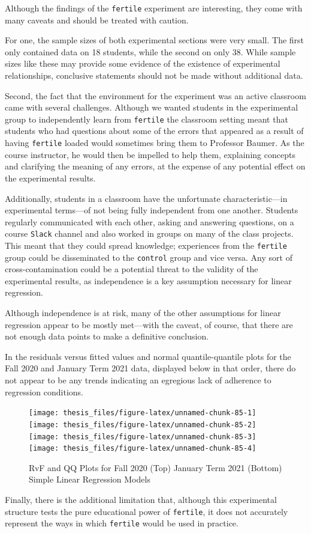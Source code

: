 \documentclass[12pt,twoside]{reedthesis}
\begin{document}
Although the findings of the \texttt{fertile} experiment are interesting, they come with many caveats and should be treated with caution.

For one, the sample sizes of both experimental sections were very small. The first only contained data on 18 students, while the second on only 38. While sample sizes like these may provide some evidence of the existence of experimental relationships, conclusive statements should not be made without additional data.

Second, the fact that the environment for the experiment was an active classroom came with several challenges. Although we wanted students in the experimental group to independently learn from \texttt{fertile} the classroom setting meant that students who had questions about some of the errors that appeared as a result of having \texttt{fertile} loaded would sometimes bring them to Professor Baumer. As the course instructor, he would then be impelled to help them, explaining concepts and clarifying the meaning of any errors, at the expense of any potential effect on the experimental results.

Additionally, students in a classroom have the unfortunate characteristic---in experimental terms---of not being fully independent from one another. Students regularly communicated with each other, asking and answering questions, on a course \texttt{Slack} channel and also worked in groups on many of the class projects. This meant that they could spread knowledge; experiences from the \texttt{fertile} group could be disseminated to the \texttt{control} group and vice versa. Any sort of cross-contamination could be a potential threat to the validity of the experimental results, as independence is a key assumption necessary for linear regression.

Although independence is at risk, many of the other assumptions for linear regression appear to be mostly met---with the caveat, of course, that there are not enough data points to make a definitive conclusion.

In the residuals versus fitted values and normal quantile-quantile plots for the Fall 2020 and January Term 2021 data, displayed below in that order, there do not appear to be any trends indicating an egregious lack of adherence to regression conditions.
\begin{figure}
\texttt{[image: thesis\_files/figure-latex/unnamed-chunk-85-1]} \texttt{[image: thesis\_files/figure-latex/unnamed-chunk-85-2]} \texttt{[image: thesis\_files/figure-latex/unnamed-chunk-85-3]} \texttt{[image: thesis\_files/figure-latex/unnamed-chunk-85-4]} \caption{RvF and QQ Plots for Fall 2020 (Top) January Term 2021 (Bottom) Simple Linear Regression Models}\label{fig:unnamed-chunk-85}
\end{figure}
Finally, there is the additional limitation that, although this experimental structure tests the pure educational power of \texttt{fertile}, it does not accurately represent the ways in which \texttt{fertile} would be used in practice.
\end{document}
